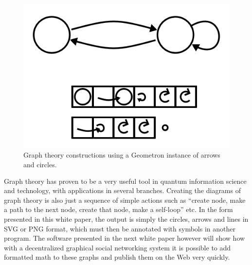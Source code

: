 \documentclass[11pt]{article}
\begin{document}
\begin{figure}

\includegraphics[width=\linewidth]{figures/figure23_graphtheory.png}

\caption{Graph theory constructions using a Geometron instance of arrows and circles.}
\end{figure}




   Graph theory has proven to be a very useful tool in quantum information science and technology, with applications in several branches.  Creating the diagrams of graph theory is also just a sequence of simple actions such as ``create node, make a path to the next node, create that node, make a self-loop'' etc.  In the form presented in this white paper, the output is simply the circles, arrows and lines in SVG or PNG format, which must then be annotated with symbols in another program.  The software presented in the next white paper however will show how with a decentralized graphical social networking system it is possible to add formatted math to these graphs and publish them on the Web very quickly. 
\end{document}
